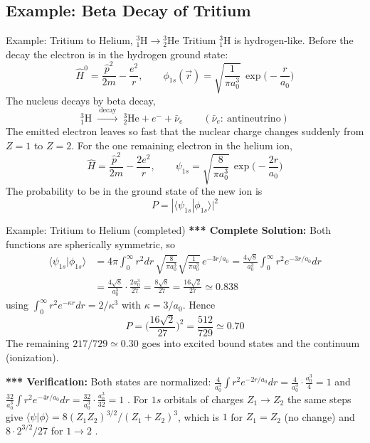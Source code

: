 \documentclass[11pt,a4paper]{article}
\begin{document}
\subsection{Example: Beta Decay of Tritium}
\begin{prob}{Example: Tritium to Helium, $^{3}_{1}\text{H}\to{}^{3}_{2}\text{He}$}
Tritium $^3_1$H is hydrogen-like. Before the decay the electron is in the hydrogen ground state:
\[
\hat H^0=\frac{\hat p^2}{2m}-\frac{e^2}r,\qquad \phi_{1s}(\vec r)=\sqrt{\frac1{\pi a_0^3}}\,\exp\Big(-\frac r{a_0}\Big)
\]
The nucleus decays by beta decay,
\[
{}^3_1\text{H}\;\xrightarrow{\ \text{decay}\ }\;{}^3_2\text{He}+e^-+\bar\nu_e\qquad(\bar\nu_e:\ \text{antineutrino})
\]
The emitted electron leaves so fast that the nuclear charge changes suddenly from $Z=1$ to $Z=2$. For the one remaining electron in the helium ion,
\[
\hat H=\frac{\hat p^2}{2m}-\frac{2e^2}r,\qquad \psi_{1s}=\sqrt{\frac8{\pi a_0^3}}\,\exp\Big(-\frac{2r}{a_0}\Big)
\]
The probability to be in the ground state of the new ion is
\[
P=|\langle\psi_{1s}|\phi_{1s}\rangle|^2
\]
\end{prob}
\begin{prob}{Example: Tritium to Helium (completed)}
\textbf{*** Complete Solution:} Both functions are spherically symmetric, so
\begin{align*}
\langle\psi_{1s}|\phi_{1s}\rangle&=4\pi\int_0^\infty r^2dr\,\sqrt{\frac8{\pi a_0^3}}\sqrt{\frac1{\pi a_0^3}}\,e^{-3r/a_0}
=\frac{4\sqrt8}{a_0^3}\int_0^\infty r^2e^{-3r/a_0}dr\\
&=\frac{4\sqrt8}{a_0^3}\cdot\frac{2a_0^3}{27}=\frac{8\sqrt8}{27}=\frac{16\sqrt2}{27}\simeq0.838
\end{align*}
using $\int_0^\infty r^2e^{-\kappa r}dr=2/\kappa^3$ with $\kappa=3/a_0$. Hence
\[
\boxed{P=\Big(\frac{16\sqrt2}{27}\Big)^2=\frac{512}{729}\simeq0.70}
\]
The remaining $217/729\simeq0.30$ goes into excited bound states and the continuum (ionization).

\textbf{*** Verification:} Both states are normalized: $\frac4{a_0^3}\int r^2e^{-2r/a_0}dr=\frac4{a_0^3}\cdot\frac{a_0^3}4=1$ and $\frac{32}{a_0^3}\int r^2e^{-4r/a_0}dr=\frac{32}{a_0^3}\cdot\frac{a_0^3}{32}=1$ \checkmark. For $1s$ orbitals of charges $Z_1\to Z_2$ the same steps give $\langle\psi|\phi\rangle=8(Z_1Z_2)^{3/2}/(Z_1+Z_2)^3$, which is $1$ for $Z_1=Z_2$ (no change) and $8\cdot2^{3/2}/27$ for $1\to2$ \checkmark.
\end{prob}
\end{document}
